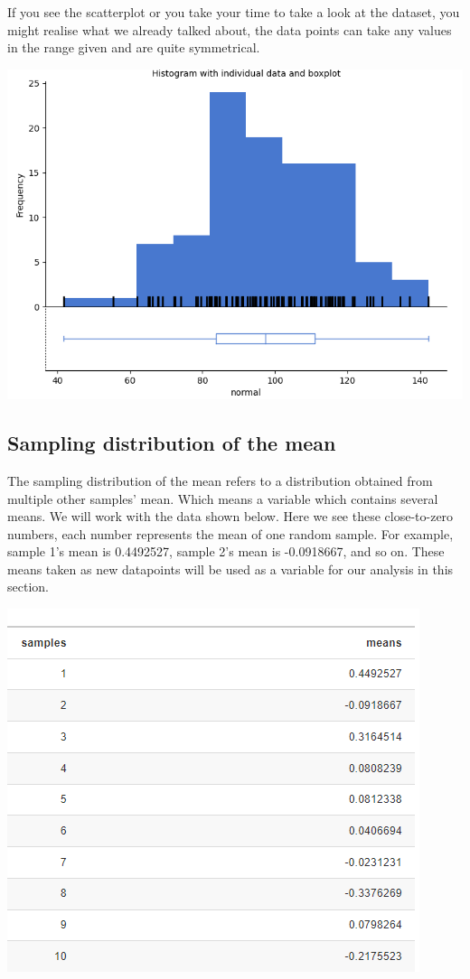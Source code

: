 \documentclass[
]{book}
\begin{document}
If you see the scatterplot or you take your time to take a look at the dataset, you might realise what we already talked about, the data points can take any values in the range given and are quite symmetrical.

\includegraphics{img/ch4/4.5normalhisto.png}

\hypertarget{sampling-distribution-of-the-mean}{%
\subsection{Sampling distribution of the mean}\label{sampling-distribution-of-the-mean}}

The sampling distribution of the mean refers to a distribution obtained from multiple other samples' mean. Which means a variable which contains several means. We will work with the data shown below. Here we see these close-to-zero numbers, each number represents the mean of one random sample. For example, sample 1's mean is 0.4492527, sample 2's mean is -0.0918667, and so on. These means taken as new datapoints will be used as a variable for our analysis in this section.

\includegraphics{img/ch4/4.6samplemeans.png}
\end{document}
